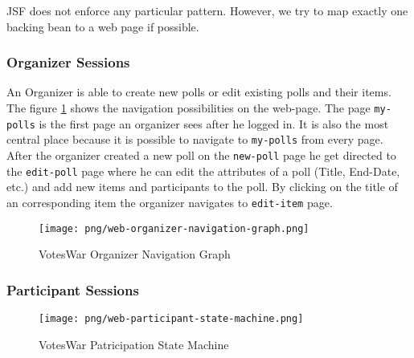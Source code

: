 JSF does not enforce any particular pattern.
However, we try to map exactly one backing bean to a web page if possible.


\subsubsection{Organizer Sessions}
An Organizer is able to create new polls or edit existing polls and their items.
The figure \ref{figure:web-organizer-navigation-graph} shows the navigation possibilities on the web-page. The page \texttt{my-polls} is the first page an organizer sees after he logged in. It is also the most central place because it is possible to navigate to \texttt{my-polls} from every page.
After the organizer created a new poll on the \texttt{new-poll} page he get directed to the \texttt{edit-poll} page where he can edit the attributes of a poll (Title, End-Date, etc.) and add new items and participants to the poll. By clicking on the title of an corresponding item the organizer navigates to \texttt{edit-item} page.



\begin{figure}[h]
\centering
\texttt{[image: png/web-organizer-navigation-graph.png]}
\caption{VotesWar Organizer Navigation Graph}
\label{figure:web-organizer-navigation-graph}
\end{figure}

\subsubsection{Participant Sessions}
\begin{figure}[h]
\centering
\texttt{[image: png/web-participant-state-machine.png]}
\caption{VotesWar Patricipation State Machine}
\label{figure:web-participation-state-machine}
\end{figure}

%



